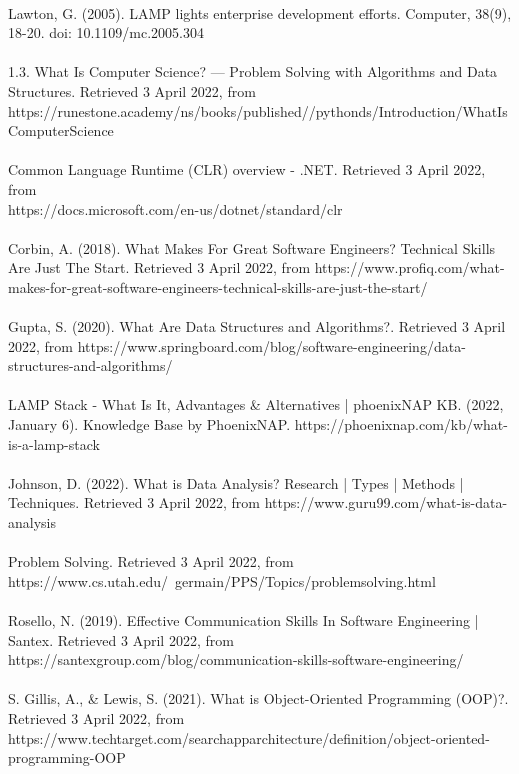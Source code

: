 \documentclass[a4paper, 11pt]{report}
\begin{document}
	\\
	Lawton, G. (2005). LAMP lights enterprise development efforts. Computer, 38(9), 18-20. doi: 10.1109/mc.2005.304
	\\
	\\
	1.3. What Is Computer Science? — Problem Solving with Algorithms and Data Structures. Retrieved 3 April 2022, from \\https://runestone.academy/ns/books/published//pythonds/Introduction/WhatIsComputerScience
	\\
	\\
	Common Language Runtime (CLR) overview - .NET. Retrieved 3 April 2022, from \\https://docs.microsoft.com/en-us/dotnet/standard/clr
	\\
	\\
	Corbin, A. (2018). What Makes For Great Software Engineers? Technical Skills Are Just The Start. Retrieved 3 April 2022, from https://www.profiq.com/what-makes-for-great-software-engineers-technical-skills-are-just-the-start/
	\\
	\\
	Gupta, S. (2020). What Are Data Structures and Algorithms?. Retrieved 3 April 2022, from https://www.springboard.com/blog/software-engineering/data-structures-and-algorithms/
	\\
	\\
	LAMP Stack - What Is It, Advantages & Alternatives | phoenixNAP KB. (2022, January 6). Knowledge Base by PhoenixNAP. https://phoenixnap.com/kb/what-is-a-lamp-stack
	\\
	\\
	Johnson, D. (2022). What is Data Analysis? Research | Types | Methods | Techniques. Retrieved 3 April 2022, from https://www.guru99.com/what-is-data-analysis
	\\
	\\
	Problem Solving. Retrieved 3 April 2022, from 
	\\https://www.cs.utah.edu/~germain/PPS/Topics/problemsolving.html
	\\
	\\
	Rosello, N. (2019). Effective Communication Skills In Software Engineering | Santex. Retrieved 3 April 2022, from https://santexgroup.com/blog/communication-skills-software-engineering/
	\\
	\\
	S. Gillis, A., & Lewis, S. (2021). What is Object-Oriented Programming (OOP)?. Retrieved 3 April 2022, from https://www.techtarget.com/searchapparchitecture/definition/object-oriented-programming-OOP
\end{document}
